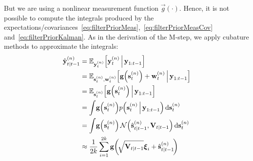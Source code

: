 		But we are using a nonlinear measurement function \( \vec{g}(\cdot) \). Hence, it is not possible to compute the integrals produced by the expectations/covariances~\eqref{eq:filterPriorMeas},~\eqref{eq:filterPriorMeasCov} and~\eqref{eq:filterPriorKalman}. As in the derivation of the M-step, we apply cubature methods to approximate the integrals:
		\begin{align}
			\hat{\boldsymbol{\mathrm{y}}}_{t \vert t - 1}^{(n)}
				&= \mathbb{E}_{\boldsymbol{\mathrm{y}}_t^{(n)}}\Big[\boldsymbol{\mathrm{y}}_t^{(n)} \,\Big\vert\, \boldsymbol{\mathrm{y}}_{1:t - 1}\Big]  \nonumber \\
				&= \mathbb{E}_{\boldsymbol{\mathrm{s}}_t^{(n)}, \boldsymbol{\mathrm{w}}_t^{(n)}}\Big[\boldsymbol{\mathrm{g}}\Big(\boldsymbol{\mathrm{s}}_t^{(n)}\Big) + \boldsymbol{\mathrm{w}}_t^{(n)} \,\Big\vert\, \boldsymbol{\mathrm{y}}_{1:t - 1}\Big]  \nonumber \\
				&= \mathbb{E}_{\boldsymbol{\mathrm{s}}_t^{(n)}}\Big[\boldsymbol{\mathrm{g}}\Big(\boldsymbol{\mathrm{s}}_t^{(n)}\Big) \,\Big\vert\, \boldsymbol{\mathrm{y}}_{1:t - 1}\Big]  \nonumber \\
				&= \int\! \boldsymbol{\mathrm{g}}\Big(\boldsymbol{\mathrm{s}}_t^{(n)}\Big) p\Big(\boldsymbol{\mathrm{s}}_t^{(n)} \,\Big\vert\, \boldsymbol{\mathrm{y}}_{1:t - 1}\Big) \dd{\boldsymbol{\mathrm{s}}_t^{(n)}}  \nonumber \\
				&= \int\! \boldsymbol{\mathrm{g}}\Big(\boldsymbol{\mathrm{s}}_t^{(n)}\Big) \,\mathcal{N}\Big(\hat{\boldsymbol{\mathrm{s}}}_{t \vert t - 1}^{(n)}, \boldsymbol{\mathrm{V}}_{t \vert t - 1}\Big) \dd{\boldsymbol{\mathrm{s}}_t^{(n)}}  \nonumber \\
				&\approx \frac{1}{2k} \sum_{i = 1}^{2k} \boldsymbol{\mathrm{g}}\bigg(\! \sqrt{\boldsymbol{\mathrm{V}}_{t \vert t - 1}} \boldsymbol{\mathrm{\xi}}_i + \hat{\boldsymbol{\mathrm{s}}}_{t \vert t - 1}^{(n)} \!\bigg)  \label{eq:cubatureY}
		\end{align}
